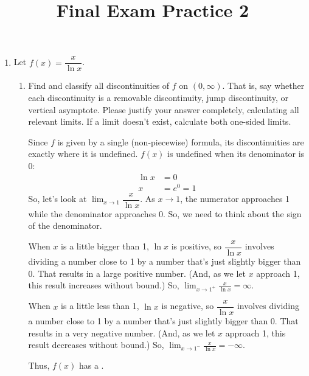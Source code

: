 \documentclass{article}
\theoremstyle{theorem}
\begin{document}
  \title{Final Exam Practice 2}


\listofproblems

\begin{enumerate}
\item {} 

  Let $f(x) = \dfrac{x}{\ln x}$.

  \begin{enumerate}
  \item
    \begin{problem}[\vfill]
      Find and classify all discontinuities of $f$ on $(0, \infty)$. That is, say whether each discontinuity is a removable discontinuity, jump discontinuity, or vertical asymptote. Please justify your answer completely, calculating all relevant limits. If a limit doesn't exist, calculate both one-sided limits.
    \end{problem}

    \begin{solution}
      Since $f$ is given by a single (non-piecewise) formula, its discontinuities are exactly where it is undefined. $f(x)$ is undefined when its denominator is 0:
      \begin{align*}
        \ln x &= 0 \\
        x &= e^0 = 1
      \end{align*}
      So, let's look at $\displaystyle \lim_{x \to 1} \dfrac{x}{\ln x}$. As $x \to 1$, the numerator approaches 1 while the denominator approaches 0. So, we need to think about the sign of the denominator.

      When $x$ is a little bigger than 1, $\ln x$ is positive, so $\dfrac{x}{\ln x}$ involves dividing a number close to 1 by a number that's just slightly bigger than 0. That results in a large positive number. (And, as we let $x$ approach 1, this result increases without bound.) So, $\boxed{ \lim_{x \to 1^+} \frac{x}{\ln x} = \infty}$.

      When $x$ is a little less than 1, $\ln x$ is negative, so $\dfrac{x}{\ln x}$ involves dividing a number close to 1 by a number that's just slightly bigger than 0. That results in a very negative number. (And, as we let $x$ approach 1, this result decreases without bound.) So, $\boxed{ \lim_{x \to 1^-} \frac{x}{\ln x} = - \infty}$.

      Thus, $f(x)$ has a . 
    \end{solution}


\end{enumerate}
\end{enumerate}
\end{document}
